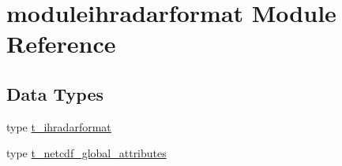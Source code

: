 \hypertarget{namespacemoduleihradarformat}{}\section{moduleihradarformat Module Reference}
\label{namespacemoduleihradarformat}
\subsection*{Data Types}
\begin{DoxyCompactItemize}
\item 
type \mbox{\hyperlink{structmoduleihradarformat_1_1t__ihradarformat}{t\+\_\+ihradarformat}}
\item 
type \mbox{\hyperlink{structmoduleihradarformat_1_1t__netcdf__global__attributes}{t\+\_\+netcdf\+\_\+global\+\_\+attributes}}
\end{DoxyCompactItemize}
